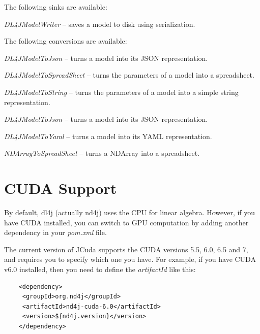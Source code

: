 \documentclass[a4paper]{book}
\begin{document}
The following sinks are available:
\begin{tight_itemize}
  \item \textit{DL4JModelWriter} -- saves a model to disk using serialization.
\end{tight_itemize}

The following conversions are available:
\begin{tight_itemize}
  \item \textit{DL4JModelToJson} -- turns a model into its JSON\cite{json} representation.
  \item \textit{DL4JModelToSpreadSheet} -- turns the parameters of a model into a spreadsheet.
  \item \textit{DL4JModelToString} -- turns the parameters of a model into a simple string representation.
  \item \textit{DL4JModelToJson} -- turns a model into its JSON\cite{json} representation.
  \item \textit{DL4JModelToYaml} -- turns a model into its YAML\cite{yaml} representation.
  \item \textit{NDArrayToSpreadSheet} -- turns a NDArray into a spreadsheet.
\end{tight_itemize}

\chapter{CUDA Support}
By default, dl4j (actually nd4j\cite{nd4j}) uses the CPU for linear algebra.
However, if you have CUDA installed, you can switch to GPU computation by
adding another dependency in your \textit{pom.xml} file.

The current version of JCuda\cite{jcuda} supports the CUDA\cite{cuda} versions
5.5, 6.0, 6.5 and 7, and requires you to specify which one you have. For example,
if you have CUDA v6.0 installed, then you need to define the \textit{artifactId}
like this:

\begin{verbatim}
    <dependency>
     <groupId>org.nd4j</groupId>
     <artifactId>nd4j-cuda-6.0</artifactId>
     <version>${nd4j.version}</version>
    </dependency>
\end{verbatim}


\end{document}
